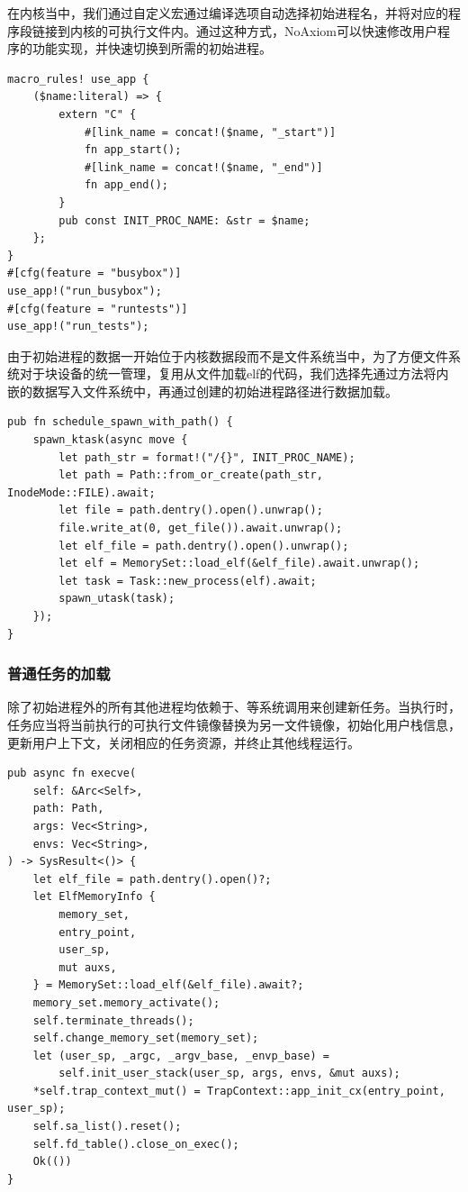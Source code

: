 \documentclass{article}
\begin{document}
在内核当中，我们通过自定义宏通过编译选项自动选择初始进程名，并将对应的程序段链接到内核的可执行文件内。通过这种方式，NoAxiom可以快速修改用户程序的功能实现，并快速切换到所需的初始进程。

\begin{lstlisting}
macro_rules! use_app {
    ($name:literal) => {
        extern "C" {
            #[link_name = concat!($name, "_start")]
            fn app_start();
            #[link_name = concat!($name, "_end")]
            fn app_end();
        }
        pub const INIT_PROC_NAME: &str = $name;
    };
}
#[cfg(feature = "busybox")]
use_app!("run_busybox");
#[cfg(feature = "runtests")]
use_app!("run_tests");
\end{lstlisting}

由于初始进程的数据一开始位于内核数据段而不是文件系统当中，为了方便文件系统对于块设备的统一管理，复用从文件加载elf的代码，我们选择先通过方法将内嵌的数据写入文件系统中，再通过创建的初始进程路径进行数据加载。

\begin{lstlisting}
pub fn schedule_spawn_with_path() {
    spawn_ktask(async move {
        let path_str = format!("/{}", INIT_PROC_NAME);
        let path = Path::from_or_create(path_str, InodeMode::FILE).await;
        let file = path.dentry().open().unwrap();
        file.write_at(0, get_file()).await.unwrap();
        let elf_file = path.dentry().open().unwrap();
        let elf = MemorySet::load_elf(&elf_file).await.unwrap();
        let task = Task::new_process(elf).await;
        spawn_utask(task);
    });
}
\end{lstlisting}

\subsubsection{普通任务的加载}

除了初始进程外的所有其他进程均依赖于、等系统调用来创建新任务。当执行时，任务应当将当前执行的可执行文件镜像替换为另一文件镜像，初始化用户栈信息，更新用户上下文，关闭相应的任务资源，并终止其他线程运行。

\begin{lstlisting}
pub async fn execve(
    self: &Arc<Self>,
    path: Path,
    args: Vec<String>,
    envs: Vec<String>,
) -> SysResult<()> {
    let elf_file = path.dentry().open()?;
    let ElfMemoryInfo {
        memory_set,
        entry_point,
        user_sp,
        mut auxs,
    } = MemorySet::load_elf(&elf_file).await?;
    memory_set.memory_activate();
    self.terminate_threads();
    self.change_memory_set(memory_set);
    let (user_sp, _argc, _argv_base, _envp_base) =
        self.init_user_stack(user_sp, args, envs, &mut auxs);
    *self.trap_context_mut() = TrapContext::app_init_cx(entry_point, user_sp);
    self.sa_list().reset();
    self.fd_table().close_on_exec();
    Ok(())
}
\end{lstlisting}
\end{document}
